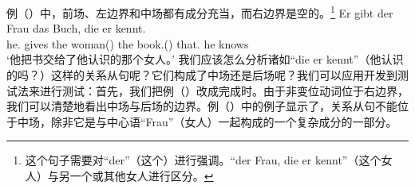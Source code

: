 例（）中，前场、左边界和中场都有成分充当，而右边界是空的。\footnote{这个句子需要对“der”（这个）进行强调。“der Frau, die er kennt”（这个女人）与另一个或其他女人进行区分。}
\ea
\gll Er        gibt  der Frau        das Buch,       die er kennt.\\
     he.\mas{} gives the woman(\fem) the book.(\neu) that.\fem{} he knows\\
\glt `他把书交给了他认识的那个女人。'
\z 
我们应该怎么分析诸如“die er kennt”（他认识的吗？）这样的关系从句呢？它们构成了中场还是后场呢？我们可以应用开发到测试法来进行测试：首先，我们把例（）改成完成时。由于非变位动词位于右边界，我们可以清楚地看出中场与后场的边界。例（）中的例子显示了，关系从句不能位于中场，除非它是与中心语“Frau”（女人）一起构成的一个复杂成分的一部分。
\eal
{}
\zl


